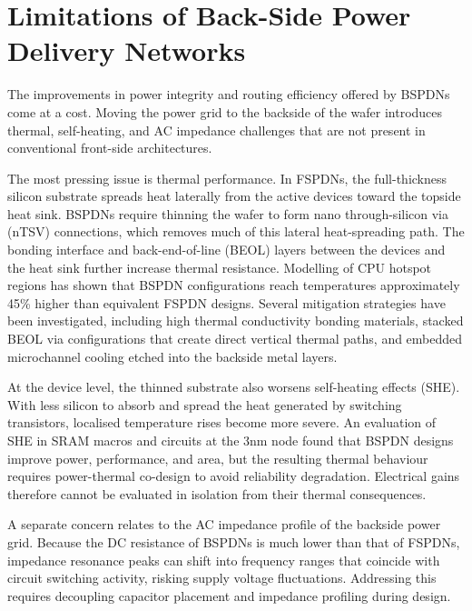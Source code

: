 \section{Limitations of Back-Side Power Delivery Networks}

The improvements in power integrity and routing efficiency offered by BSPDNs come at a cost. Moving the power grid to the backside of the wafer introduces thermal, self-heating, and AC impedance challenges that are not present in conventional front-side architectures.

The most pressing issue is thermal performance. In FSPDNs, the full-thickness silicon substrate spreads heat laterally from the active devices toward the topside heat sink. BSPDNs require thinning the wafer to form nano through-silicon via (nTSV) connections, which removes much of this lateral heat-spreading path. The bonding interface and back-end-of-line (BEOL) layers between the devices and the heat sink further increase thermal resistance. Modelling of CPU hotspot regions has shown that BSPDN configurations reach temperatures approximately 45\% higher than equivalent FSPDN designs\cite{10925422}. Several mitigation strategies have been investigated, including high thermal conductivity bonding materials, stacked BEOL via configurations that create direct vertical thermal paths, and embedded microchannel cooling etched into the backside metal layers\cite{10925422}.

At the device level, the thinned substrate also worsens self-heating effects (SHE). With less silicon to absorb and spread the heat generated by switching transistors, localised temperature rises become more severe. An evaluation of SHE in SRAM macros and circuits at the 3nm node found that BSPDN designs improve power, performance, and area, but the resulting thermal behaviour requires power-thermal co-design to avoid reliability degradation\cite{10529350}. Electrical gains therefore cannot be evaluated in isolation from their thermal consequences.

A separate concern relates to the AC impedance profile of the backside power grid. Because the DC resistance of BSPDNs is much lower than that of FSPDNs, impedance resonance peaks can shift into frequency ranges that coincide with circuit switching activity, risking supply voltage fluctuations\cite{8993617}. Addressing this requires decoupling capacitor placement and impedance profiling during design.

